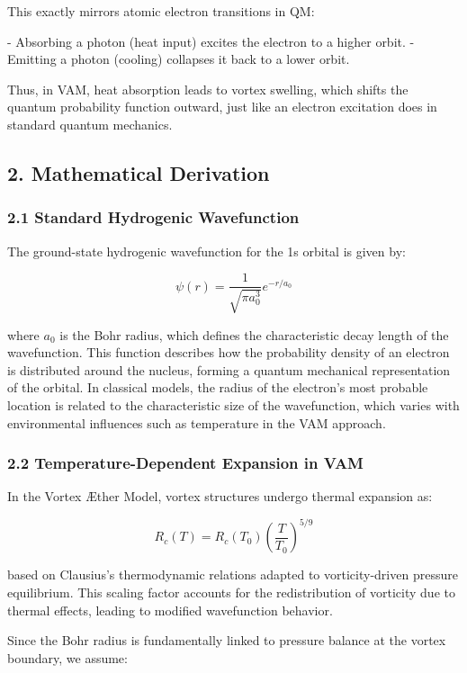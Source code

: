 \documentclass[a4paper,10pt]{article}
\begin{document}
This exactly mirrors atomic electron transitions in QM:

- Absorbing a photon (heat input) excites the electron to a higher orbit.
- Emitting a photon (cooling) collapses it back to a lower orbit.

Thus, in VAM, heat absorption leads to vortex swelling, which shifts the quantum probability function outward, just like an electron excitation does in standard quantum mechanics.

\subsection*{2. Mathematical Derivation}

\subsubsection*{2.1 Standard Hydrogenic Wavefunction}

The ground-state hydrogenic wavefunction for the 1s orbital is given by:

\[ \psi(r) = \frac{1}{\sqrt{\pi a_0^3}} e^{-r/a_0} \]

where \( a_0 \) is the Bohr radius, which defines the characteristic decay length of the wavefunction. This function describes how the probability density of an electron is distributed around the nucleus, forming a quantum mechanical representation of the orbital. In classical models, the radius of the electron's most probable location is related to the characteristic size of the wavefunction, which varies with environmental influences such as temperature in the VAM approach.

\subsubsection*{2.2 Temperature-Dependent Expansion in VAM}

In the Vortex Æther Model, vortex structures undergo thermal expansion as:

\[ R_c(T) = R_c (T_0) \left( \frac{T}{T_0} \right)^{5/9} \]

based on Clausius's thermodynamic relations adapted to vorticity-driven pressure equilibrium. This scaling factor accounts for the redistribution of vorticity due to thermal effects, leading to modified wavefunction behavior.

Since the Bohr radius is fundamentally linked to pressure balance at the vortex boundary, we assume:
\end{document}
